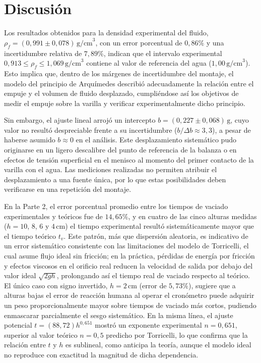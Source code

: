 \section{Discusión}

Los resultados obtenidos para la densidad experimental del fluido,
$\rho_f = (0{,}991 \pm 0{,}078)\,\text{g/cm}^3$, con un error porcentual
de $0{,}86\%$ y una incertidumbre relativa de $7{,}89\%$,
indican que el intervalo experimental
$0{,}913 \leq \rho_f \leq 1{,}069\,\text{g/cm}^3$ contiene al valor de
referencia del agua ($1{,}00\,\text{g/cm}^3$). Esto implica que, dentro
de los márgenes de incertidumbre del montaje, el modelo del principio
de Arquímedes describió adecuadamente la relación entre el empuje y el
volumen de fluido desplazado, cumpliéndose así los objetivos de medir
el empuje sobre la varilla y verificar experimentalmente dicho
principio.

Sin embargo, el ajuste lineal arrojó un intercepto
$b = (0{,}227 \pm 0{,}068)\,\text{g}$, cuyo valor no resultó
despreciable frente a su incertidumbre ($b/\Delta b \approx 3{,}3$), a
pesar de haberse asumido $b \approx 0$ en el análisis. Este
desplazamiento sistemático pudo originarse en un ligero descalibre del
punto de referencia de la balanza o en efectos de tensión superficial
en el menisco al momento del primer contacto de la varilla con el
agua. Las mediciones realizadas no permiten atribuir el desplazamiento
a una fuente única, por lo que estas posibilidades deben verificarse
en una repetición del montaje.

En la Parte 2, el error porcentual promedio entre los tiempos de
vaciado experimentales y teóricos fue de $14{,}65\%$, y en cuatro de
las cinco alturas medidas ($h = 10$, $8$, $6$ y $4\,\text{cm}$) el
tiempo experimental resultó sistemáticamente mayor que el tiempo
teórico $t_v$. Este patrón, más que dispersión aleatoria, es
indicativo de un error sistemático consistente con las limitaciones
del modelo de Torricelli, el cual asume flujo ideal sin fricción; en
la práctica, pérdidas de energía por fricción y efectos viscosos en el
orificio real reducen la velocidad de salida por debajo del valor
ideal $\sqrt{2gh}$, prolongando así el tiempo real de vaciado respecto
al teórico. El único caso con signo invertido, $h = 2\,\text{cm}$
(error de $5{,}73\%$), sugiere que a alturas bajas el error de
reacción humana al operar el cronómetro puede adquirir un peso
proporcionalmente mayor sobre tiempos de vaciado más cortos, pudiendo
enmascarar parcialmente el sesgo sistemático. En la misma línea, el ajuste potencial
$t = (88{,}72)h^{0{,}651}$ mostró un exponente experimental
$n = 0{,}651$, superior al valor teórico $n = 0{,}5$ predicho por
Torricelli, lo que confirma que la relación entre $t$ y $h$ es
sublineal, como anticipa la teoría, aunque el modelo ideal no
reproduce con exactitud la magnitud de dicha dependencia.

